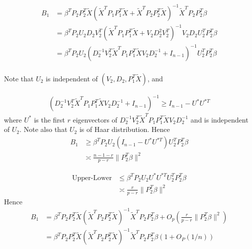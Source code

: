 \documentclass[review]{elsarticle}
\theoremstyle{plain}
\theoremstyle{definition}
\theoremstyle{remark}
\begin{document}
\begin{equation}
    \begin{aligned}
        B_1&= \beta^T P_2 P_2^T \tilde{X} {(\tilde{X}^T P_1 P_1^T \tilde{X}+\tilde{X}^T P_2 P_2^T \tilde{X})}^{-1}\tilde{X}^T P_2 P_2^T \beta\\
        &= \beta^T P_2 U_2 D_2 V^T_2 {(\tilde{X}^T P_1 P_1^T \tilde{X}+V_2 D_2^2 V_2^T)}^{-1}V_2 D_2 U_2^T P_2^T \beta\\
        &= \beta^T P_2 U_2  {(D_2^{-1} V_2^T \tilde{X}^T P_1 P_1^T \tilde{X} V_2 D_2^{-1} +I_{n-1})}^{-1} U_2^T P_2^T \beta\\
    \end{aligned}
\end{equation}

Note that $U_2$ is independent of $(V_2,D_2,P_1^T\tilde{X})$, and

\begin{equation}
    \begin{aligned}
        {(D_2^{-1}V_2^T\tilde{X}^T P_1 P_1^T \tilde{X}V_2 D_2^{-1} +I_{n-1})}^{-1}\geq I_{n-1}- U^* U^{*T}
    \end{aligned}
\end{equation}
where $U^*$ is the first $r$ eigenvectors of $D_2^{-1} V_2^T \tilde{X}^T P_1 P_1^T \tilde{X}V_2 D_2^{-1}$ and is independent of $U_2$. Note also that $U_2$ is of Haar distribution. Hence
\begin{equation}
    \begin{aligned}
        B_1&\geq \beta^T P_2 U_2 (I_{n-1}-U^* U^{*T})U_2^T P_2^T \beta\\
        &\asymp \frac{n-1-r}{p-r}\|P_2^T \beta\|^2
    \end{aligned}
\end{equation}

\begin{equation}
    \begin{aligned}
        \textrm{Upper-Lower}&\leq \beta^T P_2 U_2 U^* U^{*T}U_2^T P_2^T \beta\\
        &\asymp \frac{r}{p-r}\|P_2^T \beta\|^2
    \end{aligned}
\end{equation}
Hence 
\begin{equation}
    \begin{aligned}
        B_1&=\beta^T P_2 P_2^T \tilde{X} {(\tilde{X}^T P_2 P_2^T \tilde{X})}^{-1}\tilde{X}^T P_2 P_2^T \beta+O_p(\frac{r}{p-r}\|P_2^T \beta\|^2)\\
        &=\beta^T P_2 P_2^T \tilde{X} {(\tilde{X}^T P_2 P_2^T \tilde{X})}^{-1}\tilde{X}^T P_2 P_2^T \beta(1+O_P(1/n))\\
    \end{aligned}
\end{equation}
\end{document}
